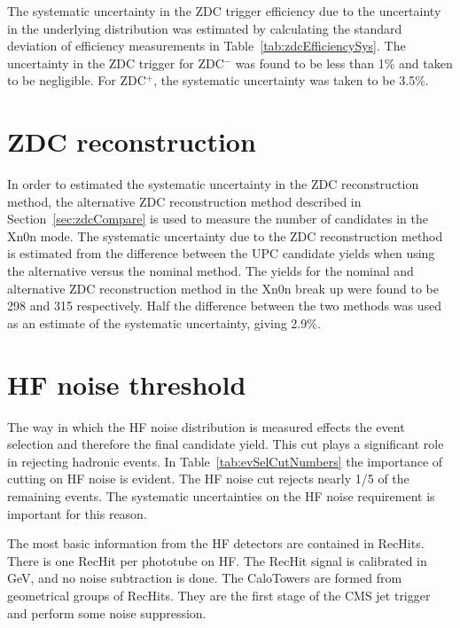     The systematic uncertainty in the ZDC trigger efficiency due to the 
      uncertainty in the underlying distribution was estimated by calculating 
      the standard deviation of efficiency measurements in Table~\ref{tab:zdcEfficiencySys}.
    The uncertainty in the ZDC trigger for ZDC$^{-}$ was found to be less than 
      1\% and taken to be negligible. 
    For ZDC$^{+}$, the systematic uncertainty was taken to be 3.5\%.

  \section{ZDC reconstruction}
    In order to estimated the systematic uncertainty in the ZDC reconstruction
      method, the alternative ZDC reconstruction method described in 
      Section~\ref{sec:zdcCompare} is used to measure the number of candidates
      in the Xn0n mode.
    The systematic uncertainty due to the ZDC reconstruction method is
      estimated from the difference between the UPC \JPsi{} candidate yields 
      when using the alternative versus the nominal method.
    The yields for the nominal and alternative ZDC reconstruction method in the 
      Xn0n break up were found to be 298 and 315 respectively. 
    Half the difference between the two methods was used as an estimate of 
      the systematic uncertainty, giving 2.9\%.

  \section{HF noise threshold}
    The way in which the HF noise distribution is measured effects the event 
      selection and therefore the final candidate yield.
    This cut plays a significant role in rejecting hadronic events.
    In Table~\ref{tab:evSelCutNumbers} the importance of cutting on HF noise
      is evident. 
    The HF noise cut rejects nearly 1/5 of the remaining events. 
    The systematic uncertainties on the HF noise requirement is important for
      this reason.
   
    The most basic information from the HF detectors are contained in RecHits. 
    There is one RecHit per phototube on HF. 
    The RecHit signal is calibrated in GeV, and no noise subtraction is done. 
    The CaloTowers are formed from geometrical groups of RecHits. 
    They are the first stage of the CMS jet trigger and perform some noise 
      suppression.


